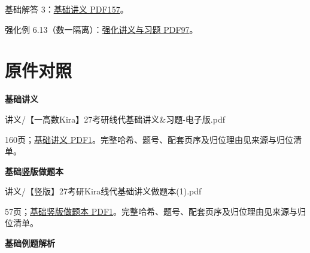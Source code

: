 \documentclass[UTF8,fontset=fandol,11pt,a4paper]{ctexart}
\newcommand{\source}[1]{{\footnotesize\color{Muted}#1\par}}
\begin{document}
基础解答 3：\href{file:///Users/skyintelligence/Desktop/\%E5\%BE\%97\%E8\%AF\%BB\%E4\%B8\%AA\%E7\%A0\%94-\%E5\%8C\%97\%E5\%A4\%A7\%E8\%BD\%AF\%E5\%BE\%AE/\%E6\%95\%B0\%E5\%AD\%A6\%20150/\%E8\%AE\%B2\%E4\%B9\%89/\%E3\%80\%90\%E4\%B8\%80\%E9\%AB\%98\%E6\%95\%B0Kira\%E3\%80\%9127\%E8\%80\%83\%E7\%A0\%94\%E7\%BA\%BF\%E4\%BB\%A3\%E5\%9F\%BA\%E7\%A1\%80\%E8\%AE\%B2\%E4\%B9\%89\%26\%E4\%B9\%A0\%E9\%A2\%98-\%E7\%94\%B5\%E5\%AD\%90\%E7\%89\%88.pdf\#page=157}{基础讲义 PDF157}。\par
强化例 6.13（数一隔离）：\href{file:///Users/skyintelligence/Desktop/\%E5\%BE\%97\%E8\%AF\%BB\%E4\%B8\%AA\%E7\%A0\%94-\%E5\%8C\%97\%E5\%A4\%A7\%E8\%BD\%AF\%E5\%BE\%AE/\%E6\%95\%B0\%E5\%AD\%A6\%20150/Kira\%C2\%B727\%E7\%BA\%BF\%E6\%80\%A7\%E4\%BB\%A3\%E6\%95\%B0\%E5\%BC\%BA\%E5\%8C\%96\%E8\%AE\%B2\%E4\%B9\%89\%2B\%E4\%B9\%A0\%E9\%A2\%98.pdf\#page=97}{强化讲义与习题 PDF97}。\par
\clearpage\section*{原件对照}
\textbf{基础讲义}\par
讲义/【一高数Kira】27考研线代基础讲义\&习题-电子版.pdf\par
\source{160页；\href{file:///Users/skyintelligence/Desktop/\%E5\%BE\%97\%E8\%AF\%BB\%E4\%B8\%AA\%E7\%A0\%94-\%E5\%8C\%97\%E5\%A4\%A7\%E8\%BD\%AF\%E5\%BE\%AE/\%E6\%95\%B0\%E5\%AD\%A6\%20150/\%E8\%AE\%B2\%E4\%B9\%89/\%E3\%80\%90\%E4\%B8\%80\%E9\%AB\%98\%E6\%95\%B0Kira\%E3\%80\%9127\%E8\%80\%83\%E7\%A0\%94\%E7\%BA\%BF\%E4\%BB\%A3\%E5\%9F\%BA\%E7\%A1\%80\%E8\%AE\%B2\%E4\%B9\%89\%26\%E4\%B9\%A0\%E9\%A2\%98-\%E7\%94\%B5\%E5\%AD\%90\%E7\%89\%88.pdf\#page=1}{基础讲义 PDF1}。完整哈希、题号、配套页序及归位理由见来源与归位清单。}
\textbf{基础竖版做题本}\par
讲义/【竖版】27考研Kira线代基础讲义做题本(1).pdf\par
\source{57页；\href{file:///Users/skyintelligence/Desktop/\%E5\%BE\%97\%E8\%AF\%BB\%E4\%B8\%AA\%E7\%A0\%94-\%E5\%8C\%97\%E5\%A4\%A7\%E8\%BD\%AF\%E5\%BE\%AE/\%E6\%95\%B0\%E5\%AD\%A6\%20150/\%E8\%AE\%B2\%E4\%B9\%89/\%E3\%80\%90\%E7\%AB\%96\%E7\%89\%88\%E3\%80\%9127\%E8\%80\%83\%E7\%A0\%94Kira\%E7\%BA\%BF\%E4\%BB\%A3\%E5\%9F\%BA\%E7\%A1\%80\%E8\%AE\%B2\%E4\%B9\%89\%E5\%81\%9A\%E9\%A2\%98\%E6\%9C\%AC\%281\%29.pdf\#page=1}{基础竖版做题本 PDF1}。完整哈希、题号、配套页序及归位理由见来源与归位清单。}
\textbf{基础例题解析}\par
\end{document}
